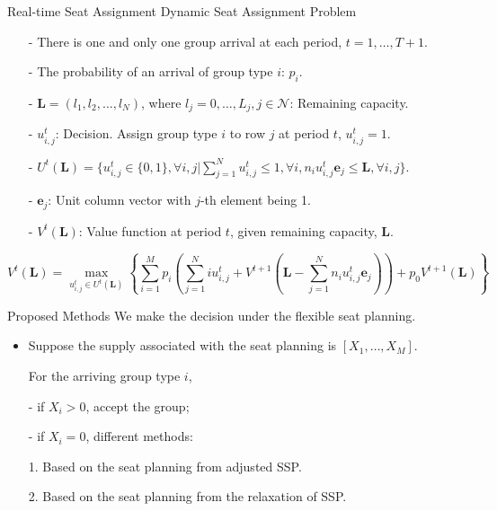   \begin{frame}{Real-time Seat Assignment}
    \centering
    Dynamic Seat Assignment Problem
    \small
    \begin{itemize}
    \item[-] There is one and only one group arrival at each period, $t = 1, \ldots, T+1$. 
    \item[-] The probability of an arrival of group type $i$: $p_i$.
    \item[-] $\mathbf{L} = (l_1, l_2, \ldots, l_{N})$, where $l_j =0,\ldots, L_j, j\in \mathcal{N}$: Remaining capacity.
    \item[-] $u_{i,j}^{t}$: Decision. Assign group type $i$ to row $j$ at period $t$, $u_{i,j}^t =1$.
    \item[-] $U^{t}(\mathbf{L}) = \{u_{i,j}^{t} \in\{0,1\}, \forall i,j| \sum_{j=1}^{N} u_{i,j}^{t} \leq 1, \forall i, n_{i}u_{i,j}^{t}\mathbf{e}_j \leq \mathbf{L}, \forall i,j \}$.
    \item[-] $\mathbf{e}_j$: Unit column vector with $j$-th element being 1.
    \item[-] $V^{t}(\mathbf{L})$: Value function at period $t$, given remaining capacity, $\mathbf{L}$.
    \end{itemize}

    $$V^{t}(\mathbf{L}) = \max_{u_{i,j}^{t} \in U^{t}(\mathbf{L})}\left\{ \sum_{i=1}^{M} p_i ( \sum_{j=1}^{N} i u_{i,j}^{t} + V^{t+1}(\mathbf{L}- \sum_{j=1}^{N} n_i u_{i,j}^{t}\mathbf{e}_j)) + p_0 V^{t+1}(\mathbf{L})\right\}$$
    \small
\end{frame}

  \begin{frame}{Proposed Methods}
    We make the decision under the flexible seat planning.

    \begin{itemize}
      \item Suppose the supply associated with the seat planning is $[X_{1}, \ldots, X_M]$.
      
      \vspace{0.5cm}

      For the arriving group type $i$,

      \item[-] if $X_i > 0$, accept the group; 
      
      \item[-] if $X_i = 0$, different methods:
      
      \vspace{0.5cm}

      1. Based on the seat planning from adjusted SSP.

      2. Based on the seat planning from the relaxation of SSP.

    \end{itemize}
  \end{frame}

